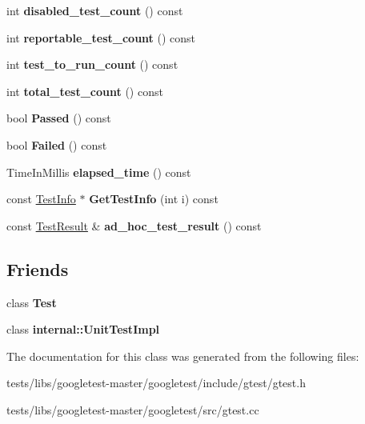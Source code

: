 \begin{DoxyCompactItemize}
int {\bfseries disabled\+\_\+test\+\_\+count} () const
\item 
\mbox{\label{classtesting_1_1TestCase_ae4e69f1a77b6aba274981e987e50acab}} 
int {\bfseries reportable\+\_\+test\+\_\+count} () const
\item 
\mbox{\label{classtesting_1_1TestCase_a57f115315eb756e23be6651bb5e6c638}} 
int {\bfseries test\+\_\+to\+\_\+run\+\_\+count} () const
\item 
\mbox{\label{classtesting_1_1TestCase_aba3cab19aaf7295284f0832f2cf895a3}} 
int {\bfseries total\+\_\+test\+\_\+count} () const
\item 
\mbox{\label{classtesting_1_1TestCase_a29bbfd227b732a90198b5280c039c271}} 
bool {\bfseries Passed} () const
\item 
\mbox{\label{classtesting_1_1TestCase_ae71c30eab6f1673b82090a0e745c2aa5}} 
bool {\bfseries Failed} () const
\item 
\mbox{\label{classtesting_1_1TestCase_acd7d6a77bce06da6ef90f5dad1c4def1}} 
Time\+In\+Millis {\bfseries elapsed\+\_\+time} () const
\item 
\mbox{\label{classtesting_1_1TestCase_a441e0eca232643671dc365c2924c255c}} 
const \hyperlink{classtesting_1_1TestInfo}{Test\+Info} $\ast$ {\bfseries Get\+Test\+Info} (int i) const
\item 
\mbox{\label{classtesting_1_1TestCase_a6d5fc5003bc3352f3ddae7dadc6d2364}} 
const \hyperlink{classtesting_1_1TestResult}{Test\+Result} \& {\bfseries ad\+\_\+hoc\+\_\+test\+\_\+result} () const
\end{DoxyCompactItemize}
\subsection*{Friends}
\begin{DoxyCompactItemize}
\item 
\mbox{\label{classtesting_1_1TestCase_a5b78b1c2e1fa07ffed92da365593eaa4}} 
class {\bfseries Test}
\item 
\mbox{\label{classtesting_1_1TestCase_acc0a5e7573fd6ae7ad1878613bb86853}} 
class {\bfseries internal\+::\+Unit\+Test\+Impl}
\end{DoxyCompactItemize}


The documentation for this class was generated from the following files\+:\begin{DoxyCompactItemize}
\item 
tests/libs/googletest-\/master/googletest/include/gtest/gtest.\+h\item 
tests/libs/googletest-\/master/googletest/src/gtest.\+cc\end{DoxyCompactItemize}

